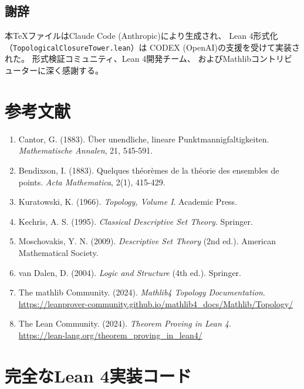 \documentclass[a4paper,12pt]{ltjsarticle}
\theoremstyle{definition}
\begin{document}
\subsection{謝辞}

本TeXファイルはClaude Code (Anthropic)により生成され、
Lean 4形式化（\texttt{TopologicalClosureTower.lean}）は
CODEX (OpenAI)の支援を受けて実装された。
形式検証コミュニティ、Lean 4開発チーム、
およびMathlibコントリビューターに深く感謝する。

\section*{参考文献}

\begin{enumerate}
\item Cantor, G. (1883). Über unendliche, lineare Punktmannigfaltigkeiten. \textit{Mathematische Annalen}, 21, 545-591.

\item Bendixson, I. (1883). Quelques théorèmes de la théorie des ensembles de points. \textit{Acta Mathematica}, 2(1), 415-429.

\item Kuratowski, K. (1966). \textit{Topology, Volume I}. Academic Press.

\item Kechris, A. S. (1995). \textit{Classical Descriptive Set Theory}. Springer.

\item Moschovakis, Y. N. (2009). \textit{Descriptive Set Theory} (2nd ed.). American Mathematical Society.

\item van Dalen, D. (2004). \textit{Logic and Structure} (4th ed.). Springer.

\item The mathlib Community. (2024). \textit{Mathlib4 Topology Documentation}. \\
\url{https://leanprover-community.github.io/mathlib4_docs/Mathlib/Topology/}

\item The Lean Community. (2024). \textit{Theorem Proving in Lean 4}. \\
\url{https://lean-lang.org/theorem_proving_in_lean4/}
\end{enumerate}

\appendix

\section{完全なLean 4実装コード}
\end{document}
